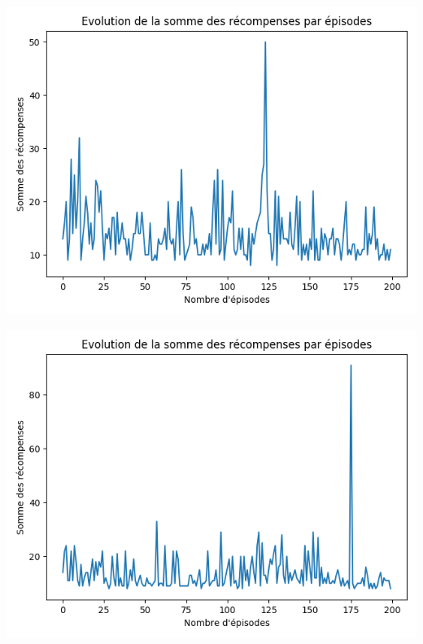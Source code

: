 \documentclass[10pt,a4paper]{article}
\begin{document}
\begin{minipage}{.5\textwidth}
  \centering
  \includegraphics[scale=0.3]{../performances/tarnetTanh24.png}
\end{minipage}%
\begin{minipage}{.5\textwidth}
  \centering
  \includegraphics[scale=0.3]{../performances/netRelu24.png}
\end{minipage}
\end{document}
